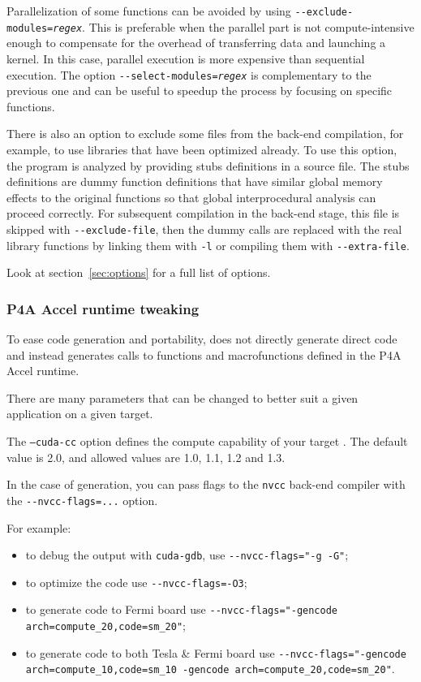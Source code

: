 \documentclass[a4paper]{article}
\begin{document}
Parallelization of some functions can be avoided by using
\texttt{-{}-exclude-modules=\emph{regex}}. This is preferable when the
parallel part is not compute-intensive enough to compensate for
the overhead of transferring data and launching a kernel. In this
case, parallel execution is more expensive than sequential execution. 
The option \texttt{-{}-select-modules=\emph{regex}} is complementary to the
previous one and can be useful to speedup the process by focusing on specific
functions.

There is also an option to exclude some files from the back-end
compilation, for example, to use libraries that have been optimized
already. To use this option,
the program is analyzed by providing stubs definitions in a source
file. The stubs definitions
are dummy function definitions that have similar global memory
effects to the original functions so that \Apips global
interprocedural analysis can proceed correctly. For subsequent compilation
in the back-end stage, this file is skipped with \verb|--exclude-file|, then
the dummy calls are replaced with the real library functions by linking
them with \texttt{-l} or compiling them with \verb|--extra-file|.

Look at section~\ref{sec:options} for a full list of options.


\subsubsection{P4A Accel runtime tweaking}
\label{sec:p4a-accel-runtime}

To ease code generation and portability, \Apfa does not directly generate
direct \Acuda code and instead generates calls to functions and
macrofunctions defined in the P4A Accel runtime.

There are many parameters that can be changed to better suit a given
application on a given target. 

The \texttt{--cuda-cc} option defines the compute capability of your target 
\Agpu. The default value is 2.0, and allowed values are 1.0, 1.1, 1.2 and 1.3. 

In the case of \Acuda generation, you can pass flags to the \texttt{nvcc}
back-end compiler with the \verb|--nvcc-flags=...| option.

For example:
\begin{itemize}
\item to debug the output with \texttt{cuda-gdb}, use
  \verb|--nvcc-flags="-g -G"|;
\item to optimize the \Acuda code use \verb|--nvcc-flags=-O3|;
\item  to generate code to Fermi board use
  \verb|--nvcc-flags="-gencode arch=compute_20,code=sm_20"|;
\item to generate code to both Tesla \& Fermi board use
  \verb|--nvcc-flags="-gencode arch=compute_10,code=sm_10 -gencode arch=compute_20,code=sm_20"|.
\end{itemize}
\end{document}

